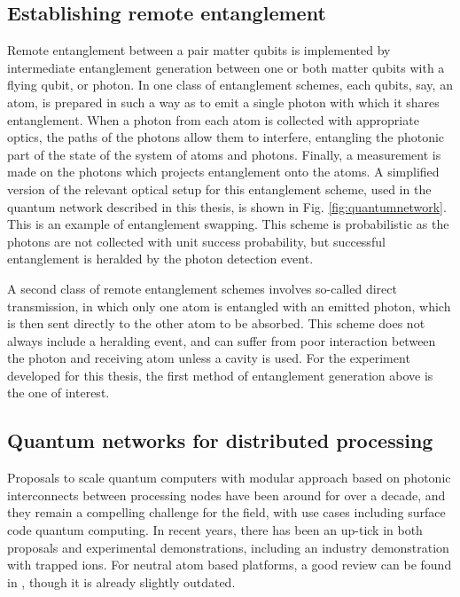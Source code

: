 \subsection{Establishing remote entanglement}\label{sec:reg}

Remote entanglement between a pair matter qubits is implemented by intermediate entanglement generation between one or both matter qubits with a flying qubit, or photon. In one class of entanglement schemes, each qubits, say, an atom, is prepared in such a way as to emit a single photon with which it shares entanglement. When a photon from each atom is collected with appropriate optics, the paths of the photons allow them to interfere, entangling the photonic part of the state of the system of atoms and photons. Finally, a measurement is made on the photons which projects entanglement onto the atoms. A simplified version of the relevant optical setup for this entanglement scheme, used in the quantum network described in this thesis, is shown in Fig. \ref{fig:quantumnetwork}. This is an example of entanglement swapping\cite{Zukowski1993}. This scheme is probabilistic as the photons are not collected with unit success probability, but successful entanglement is heralded by the photon detection event.

A second class of remote entanglement schemes involves so-called direct transmission, in which only one atom is entangled with an emitted photon, which is then sent directly to the other atom to be absorbed. This scheme does not always include a heralding event, and can suffer from poor interaction between the photon and receiving atom unless a cavity is used. For the experiment developed for this thesis, the first method of entanglement generation above is the one of interest.

\subsection{Quantum networks for distributed processing}

Proposals to scale quantum computers with modular approach based on photonic interconnects between processing nodes have been around for over a decade\cite{Monroe2014modular}, and they remain a compelling challenge for the field, with use cases including surface code quantum computing\cite{Horsman2012}. In recent years, there has been an up-tick in both proposals\cite{li2024high, Young2022, Huie2021} and experimental demonstrations\cite{sinclair2024, hartung2024quantum, main2024}, including an industry demonstration with trapped ions\cite{IonQ2024}. For neutral atom based platforms, a good review can be found in \cite{Covey2023}, though it is already slightly outdated. 

